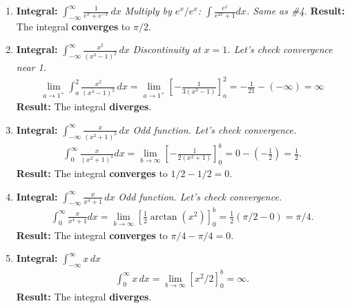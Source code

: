 \documentclass[12pt]{article}
\begin{document}
\begin{enumerate}
    \item \textbf{Integral: } $\displaystyle \int_{-\infty}^{\infty} \frac{1}{e^x+e^{-x}} \,dx$
    \textit{Multiply by $e^x/e^x$: $\int \frac{e^x}{e^{2x}+1} dx$. Same as \#4.}
    \textbf{Result:} The integral \textbf{converges} to $\pi/2$.

    \item \textbf{Integral: } $\displaystyle \int_{-\infty}^{\infty} \frac{x^2}{(x^3-1)^2} \,dx$
    \textit{Discontinuity at $x=1$. Let's check convergence near 1.}
    \begin{align*}
       \lim_{a \to 1^+} \int_{a}^{2} \frac{x^2}{(x^3-1)^2} \,dx = \lim_{a \to 1^+} [-\frac{1}{3(x^3-1)}]_a^2 = -\frac{1}{21} - (-\infty) = \infty
    \end{align*}
    \textbf{Result:} The integral \textbf{diverges}.

    \item \textbf{Integral: } $\displaystyle \int_{-\infty}^{\infty} \frac{x}{(x^2+1)^2} \,dx$
    \textit{Odd function. Let's check convergence.}
    \begin{align*}
       \int_0^\infty \frac{x}{(x^2+1)^2}dx = \lim_{b\to\infty} [-\frac{1}{2(x^2+1)}]_0^b = 0 - (-\frac{1}{2}) = \frac{1}{2}.
    \end{align*}
    \textbf{Result:} The integral \textbf{converges} to $1/2 - 1/2 = 0$.
    
    \item \textbf{Integral: } $\displaystyle \int_{-\infty}^{\infty} \frac{x}{x^4+1} \,dx$
    \textit{Odd function. Let's check convergence.}
    \begin{align*}
        \int_0^\infty \frac{x}{x^4+1}dx = \lim_{b\to\infty} [\frac{1}{2}\arctan(x^2)]_0^b = \frac{1}{2}(\pi/2 - 0) = \pi/4.
    \end{align*}
    \textbf{Result:} The integral \textbf{converges} to $\pi/4 - \pi/4 = 0$.
    
    \item \textbf{Integral: } $\displaystyle \int_{-\infty}^{\infty} x \,dx$
    \begin{align*}
        \int_0^\infty x \,dx = \lim_{b\to\infty} [x^2/2]_0^b = \infty.
    \end{align*}
    \textbf{Result:} The integral \textbf{diverges}.
\end{enumerate}
\end{document}
